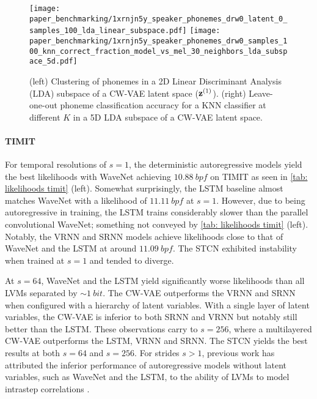 {\begin{table*}[t]
    \label{tab: likelihoods librispeech}
\end{table*}
%
\begin{figure*}[t]
    \centering
    \texttt{[image: paper\_benchmarking/1xrnjn5y\_speaker\_phonemes\_drw0\_latent\_0\_samples\_100\_lda\_linear\_subspace.pdf]}
    \hfill
    \texttt{[image: paper\_benchmarking/1xrnjn5y\_speaker\_phonemes\_drw0\_samples\_100\_knn\_correct\_fraction\_model\_vs\_mel\_30\_neighbors\_lda\_subspace\_5d.pdf]}
    \caption[Clustering of phonemes in 2D subspace of CW-VAE latent space and KNN classification accuracy.]{
    (left) Clustering of phonemes in a 2D Linear Discriminant Analysis (LDA) subspace of a CW-VAE latent space (${\mathbf{z}}^{(1)}$).
    (right) Leave-one-out phoneme classification accuracy for a KNN classifier at different $K$ in a 5D LDA subspace of a CW-VAE latent space.
    }
    \label{fig: latent space phoneme and knn}
\end{figure*}
%

\paragraph{TIMIT}
For temporal resolutions of $s=1$, the deterministic autoregressive models yield the best likelihoods with WaveNet achieving $\SI{10.88}{bpf}$ on TIMIT as seen in \cref{tab: likelihoods timit} (left). 
Somewhat surprisingly, the LSTM baseline almost matches WaveNet with a likelihood of $\SI{11.11}{bpf}$ at $s=1$. However, due to being autoregressive in training, the LSTM trains considerably slower than the parallel convolutional WaveNet; something not conveyed by \cref{tab: likelihoods timit} (left). 
Notably, the VRNN and SRNN models achieve likelihoods close to that of WaveNet and the LSTM at around $\SI{11.09}{bpf}$. The STCN exhibited instability when trained at $s=1$ and tended to diverge.

At $s=64$, WaveNet and the LSTM yield significantly worse likelihoods than all LVMs separated by $\sim\SI{1}{bit}$.
The CW-VAE outperforms the VRNN and SRNN when configured with a hierarchy of latent variables. 
With a single layer of latent variables, the CW-VAE is inferior to both SRNN and VRNN but notably still better than the LSTM. 
These observations carry to $s=256$, where a multilayered CW-VAE outperforms the LSTM, VRNN and SRNN. 
The STCN yields the best results at both $s=64$ and $s=256$. 
For strides $s>1$, previous work has attributed the inferior performance of autoregressive models without latent variables, such as WaveNet and the LSTM, to the ability of LVMs to model intrastep correlations \parencite{lai_re-examination_2019}. 

}
